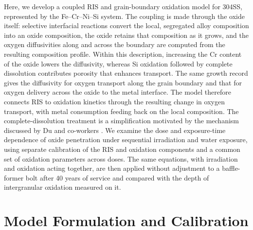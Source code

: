 \documentclass[3p,times,nonatbib]{elsarticle} %
\begin{document}
Here, we develop a coupled RIS and grain-boundary oxidation model for
304SS, represented by the Fe--Cr--Ni--Si system. The coupling is made
through the oxide itself: selective interfacial reactions convert the
local, segregated alloy composition into an oxide composition, the oxide
retains that composition as it grows, and the oxygen diffusivities along
and across the boundary are computed from the resulting composition
profile. Within this description, increasing the Cr content of the oxide lowers
the diffusivity, whereas Si oxidation followed by complete dissolution
contributes porosity that enhances transport. The same growth record
gives the diffusivity for oxygen transport along the grain boundary and
that for oxygen delivery across the oxide to the metal interface. The model
therefore connects RIS to oxidation kinetics through the resulting change
in oxygen transport, with metal consumption feeding back on the local
composition. The complete-dissolution treatment is a simplification
motivated by the mechanism discussed by Du and co-workers
\cite{du2026silicon}. We examine the dose and exposure-time dependence of
oxide penetration under sequential irradiation and water exposure, using
separate calibration of the RIS and oxidation components and a common
set of oxidation parameters across doses. The same equations, with
irradiation and oxidation acting together, are then applied without
adjustment to a baffle-former bolt after 40 years of service and compared
with the depth of intergranular oxidation measured on it.

\section{Model Formulation and Calibration}
\label{sec:method}
\end{document}
